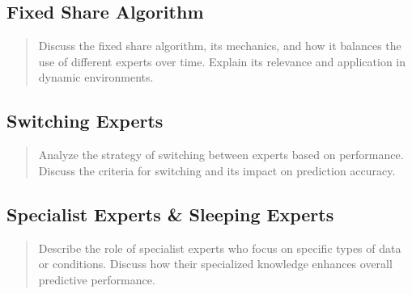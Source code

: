 \documentclass[11pt]{article} %
\theoremstyle{plain}
\theoremstyle{definition}
\begin{document}
\subsection{Fixed Share Algorithm}
\begin{quote}
  Discuss the fixed share algorithm, its mechanics, and how it balances the use of different experts over time. Explain its relevance and application in dynamic environments.
\end{quote}

\subsection{Switching Experts}
\begin{quote}
  Analyze the strategy of switching between experts based on performance. Discuss the criteria for switching and its impact on prediction accuracy.
\end{quote}

\subsection{Specialist Experts \& Sleeping Experts}
\begin{quote}
  Describe the role of specialist experts who focus on specific types of data or conditions. Discuss how their specialized knowledge enhances overall predictive performance.
\end{quote}
\end{document}
